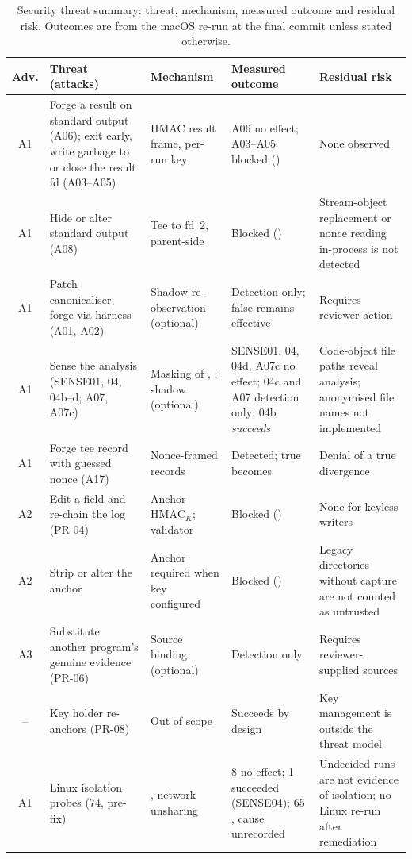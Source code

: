 \begin{table}[!t]
\caption{Security threat summary: threat, mechanism, measured outcome and residual risk. Outcomes are from the macOS re-run at the final commit unless stated otherwise.}
\label{tab:threats}
\centering
\scriptsize
\setlength{\tabcolsep}{3pt}
\begin{tabular}{|c|L{3.3cm}|L{3.4cm}|L{3.6cm}|L{4.6cm}|}
\hline
Adv. & Threat (attacks) & Mechanism & Measured outcome & Residual risk \\
\hline
A1 & Forge a result on standard output (A06); exit early, write garbage to or close the result fd (A03--A05) & HMAC result frame, per-run key & A06 no effect; A03--A05 blocked (\INS{}) & None observed \\
A1 & Hide or alter standard output (A08) & Tee to fd~2, parent-side  & Blocked (\INS{}) & Stream-object replacement or nonce reading in-process is not detected \\
A1 & Patch canonicaliser, forge via harness (A01, A02) & Shadow re-observation (optional) & Detection only; false \NDO{} remains effective & Requires reviewer action \\
A1 & Sense the analysis (SENSE01, 04, 04b--d; A07, A07c) & Masking of , ; shadow (optional) & SENSE01, 04, 04d, A07c no effect; 04c and A07 detection only; 04b \emph{succeeds} & Code-object file paths reveal analysis; anonymised file names not implemented \\
A1 & Forge tee record with guessed nonce (A17) & Nonce-framed records & Detected; true \DIV{} becomes \INS{} & Denial of a true divergence \\
A2 & Edit a field and re-chain the log (PR-04) & Anchor $\mathrm{HMAC}_K$; validator & Blocked (\INS{}) & None for keyless writers \\
A2 & Strip or alter the anchor & Anchor required when key configured & Blocked (\INS{}) & Legacy directories without capture are not counted as untrusted \\
A3 & Substitute another program's genuine evidence (PR-06) & Source binding (optional) & Detection only & Requires reviewer-supplied sources \\
-- & Key holder re-anchors (PR-08) & Out of scope & Succeeds by design & Key management is outside the threat model \\
A1 & Linux isolation probes (74, pre-fix) & , network unsharing & 8 no effect; 1 succeeded (SENSE04); 65 \INS{}, cause unrecorded & Undecided runs are not evidence of isolation; no Linux re-run after remediation \\
\hline
\end{tabular}
\end{table}

